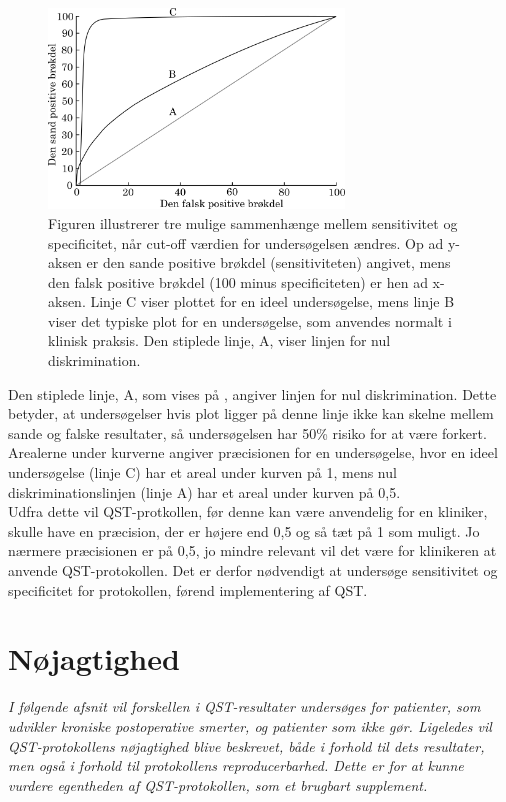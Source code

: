 \begin{figure}[H]
\centering
\includegraphics[width=0.7\textwidth]{figures/dHTAanalyse/AUC2}
\caption{Figuren illustrerer tre mulige sammenhænge mellem sensitivitet og specificitet, når cut-off værdien for undersøgelsen ændres. Op ad y-aksen er den sande positive brøkdel (sensitiviteten) angivet, mens den falsk positive brøkdel (100 minus specificiteten) er hen ad x-aksen. Linje C viser plottet for en ideel undersøgelse, mens linje B viser det typiske plot for en undersøgelse, som anvendes normalt i klinisk praksis. Den stiplede linje, A, viser linjen for nul diskrimination. \citep{Lalkhen2008}}\label{fig:AUC}
\end{figure} \vspace{-.25cm}

Den stiplede linje, A, som vises på , angiver linjen for nul diskrimination. Dette betyder, at undersøgelser hvis plot ligger på denne linje ikke kan skelne mellem sande og falske resultater, så undersøgelsen har 50\% risiko for at være forkert. Arealerne under kurverne angiver præcisionen for en undersøgelse, hvor en ideel undersøgelse (linje C) har et areal under kurven på 1, mens nul diskriminationslinjen (linje A) har et areal under kurven på 0,5. \\
Udfra dette vil QST-protkollen, før denne kan være anvendelig for en kliniker, skulle have en præcision, der er højere end 0,5 og så tæt på 1 som muligt. Jo nærmere præcisionen er på 0,5, jo mindre relevant vil det være for klinikeren at anvende QST-protokollen. Det er derfor nødvendigt at undersøge sensitivitet og specificitet for protokollen, førend implementering af QST. 

\section{Nøjagtighed}
\textit{I følgende afsnit vil forskellen i QST-resultater undersøges for patienter, som udvikler kroniske postoperative smerter, og patienter som ikke gør. Ligeledes vil QST-protokollens nøjagtighed blive beskrevet, både i forhold til dets resultater, men også i forhold til protokollens reproducerbarhed. Dette er for at kunne vurdere egentheden af QST-protokollen, som et brugbart supplement.}

